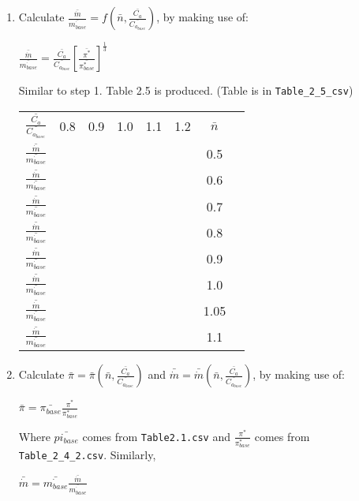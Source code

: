 \documentclass[12pt,english]{article}
\begin{document}
\begin{enumerate}
    \item Calculate $\frac{\bar{\dot{m}}}{\bar{\dot{m_{base}}}} = f (\bar{n}, \frac{\bar{C_{a}}}{\bar{C_{a_{base}}}})$, by making use of:
    
    \begin{center}
        $\frac{\bar{\dot{m}}}{\bar{\dot{m_{base}}}} = \frac{\bar{C_{a}}}{\bar{C_{a_{base}}}} \left[ \frac{\bar{\pi^{*}}}{\bar{\pi^{*}_{base}}} \right] ^{\frac{1}{3}}$
    \end{center}

    Similar to step 1. Table 2.5 is produced. (Table is in \verb|Table_2_5_csv|)

    \begin{center}
        \begin{tabular}{ c c c c c c c c }
            $\frac{\bar{C_{a}}}{\bar{C_{a_{base}}}}$ & 0.8 & 0.9 & 1.0 & 1.1 & 1.2 & $\bar{n}$ \\
            $\frac{\bar{\dot{m}}}{\bar{\dot{m_{base}}}}$ & & & & & & 0.5 \\
            $\frac{\bar{\dot{m}}}{\bar{\dot{m_{base}}}}$ & & & & & & 0.6 \\
            $\frac{\bar{\dot{m}}}{\bar{\dot{m_{base}}}}$ & & & & & & 0.7 \\
            $\frac{\bar{\dot{m}}}{\bar{\dot{m_{base}}}}$ & & & & & & 0.8 \\
            $\frac{\bar{\dot{m}}}{\bar{\dot{m_{base}}}}$ & & & & & & 0.9 \\
            $\frac{\bar{\dot{m}}}{\bar{\dot{m_{base}}}}$ & & & & & & 1.0 \\
            $\frac{\bar{\dot{m}}}{\bar{\dot{m_{base}}}}$ & & & & & & 1.05 \\
            $\frac{\bar{\dot{m}}}{\bar{\dot{m_{base}}}}$ & & & & & & 1.1 \\
        \end{tabular}
    \end{center}

    \item Calculate $\bar{\pi} = \bar{\pi} (\bar{n}, \frac{\bar{C_{a}}}{\bar{C_{a_{base}}}})$ and $\bar{\dot{m}} = \bar{\dot{m}} (\bar{n}, \frac{\bar{C_{a}}}{\bar{C_{a_{base}}}})$, by making use of:
    \begin{center}
        $\bar{\pi} = \bar{\pi_{base}} \frac{\pi^{*}}{\pi^{*}_{base}}$
    \end{center}

    Where $\bar{pi_{base}}$ comes from \verb|Table2.1.csv| and $\frac{\pi^{*}}{\pi^{*}_{base}}$ comes from \verb|Table_2_4_2.csv|. Similarly,
    \begin{center}
        $\bar{\dot{m}} = \bar{\dot{m_{base}}} \frac{\bar{\dot{m}}}{\bar{\dot{m_{base}}}}$
    \end{center}


\end{enumerate}
\end{document}
